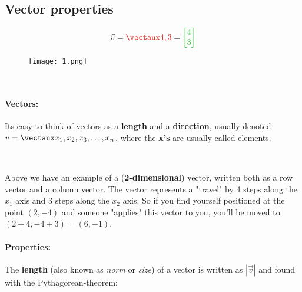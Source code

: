 \documentclass{article}
\begin{document}
\color{white}\subsection{Vector properties}\color{black}


\begin{minipage}{0.1\textwidth}
\quad
\end{minipage}
\begin{minipage}{0.25\textwidth}
\begin{align*}
\vec{v}  = \color{rooj} \vect{4 , 3}  \color{black}
 =  \color{groen} \begin{bmatrix} 4 \\ 3 \end{bmatrix}  \color{black}
\end{align*}
\end{minipage} \hfill
\begin{minipage}{0.4\textwidth}
\begin{figure}[H]
\texttt{[image: 1.png]}
\end{figure}
\end{minipage}
\begin{minipage}{0.1\textwidth}
\quad
\end{minipage}

\

\paragraph{Vectors: } Its easy to think of vectors as a \textbf{length} and a \textbf{direction}, usually denoted $v = \vect{x_1,  x_2,  x_3, \dots, x_n}$, where the \textbf{x's} are usually called \color{rooj} elements\color{black}.

\

Above we have an example of  a (\textbf{2-dimensional}) vector, written both as a \color{rooj} row vector \color{black} and a \color{groen} column vector\color{black}. The vector represents a "travel" by 4 steps along the $x_1$ axis and 3 steps along the $x_2$ axis. So if you find yourself positioned at the point $(2,-4)$ and someone "applies" this vector to you, you'll be moved to $(2+4, -4+3) = (6,-1)$.

\paragraph{Properties: }


The \textbf{length} (also known as \textit{norm} or \textit{size}) of a vector is written as $|\vec{v}|$ and found with the Pythagorean-theorem:
\end{document}
